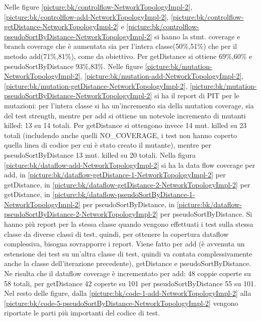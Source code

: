 \documentclass[10pt, a4paper]{article}
\newcommand{\getpicturelabel}[1]{picture:#1}
\begin{document}
	Nelle figure \ref{\getpicturelabel{bk/controlflow-NetworkTopologyImpl-2}}, \ref{\getpicturelabel{bk/controlflow-add-NetworkTopologyImpl-2}}, \ref{\getpicturelabel{bk/controlflow-getDistance-NetworkTopologyImpl-2}} e \ref{\getpicturelabel{bk/controlflow-pseudoSortByDistance-NetworkTopologyImpl-2}} si hanno la stmt. coverage e branch coverage che è aumentata sia per l'intera classe(50\%,51\%) che per il metodo add(71\%,81\%), come da obiettivo.
	Per getDistance si ottiene 69\%,60\% e pseudoSortByDistance 93\%,83\%.
	Nelle figure \ref{\getpicturelabel{bk/mutation-NetworkTopologyImpl-2}}, 
	\ref{\getpicturelabel{bk/mutation-add-NetworkTopologyImpl-2}},
	\ref{\getpicturelabel{bk/mutation-getDistance-NetworkTopologyImpl-2}},
	\ref{\getpicturelabel{bk/mutation-pseudoSortByDistance-NetworkTopologyImpl-2}} si ha il report di PIT per
	le mutazioni: per l'intera classe si ha un'incremento sia della mutation coverage, sia del test strength,
	mentre per add si ottiene un notevole incremento di mutanti killed: 13 su 14 totali.
	Per getDistance si ottengono invece 14 mut. killed su 23 totali (includendo anche quelli
	NO\_COVERAGE, i test non hanno coperto quella linea di codice per cui è stato creato il mutante), mentre per
	pseudoSortByDistance 13 mut. killed su 20 totali.
	Nella figura \ref{\getpicturelabel{bk/dataflow-add-NetworkTopologyImpl-2}} si ha la data flow coverage per add,
	in \ref{\getpicturelabel{bk/dataflow-getDistance-1-NetworkTopologyImpl-2}} per getDistance,
	in \ref{\getpicturelabel{bk/dataflow-getDistance-2-NetworkTopologyImpl-2}} per getDistance,
	in \ref{\getpicturelabel{bk/dataflow-pseudoSortByDistance-1-NetworkTopologyImpl-2}} per pseudoSortByDistance,
	in \ref{\getpicturelabel{bk/dataflow-pseudoSortByDistance-2-NetworkTopologyImpl-2}} per pseudoSortByDistance.
	Si hanno più report per la stessa classe quando vengono effettuati i test sulla stessa classe da diverse classi
	di test, quindi, per ottenere la copertura dataflow complessiva, bisogna sovrapporre i report. Viene fatto 
	per add (è avvenuta un estensione dei test su un'altra classe di test, quindi va contata complessivamente anche
	la classe dell'iterazione precedente), getDistance e pseudoSortByDistance.
	Ne risulta che il dataflow coverage è incrementato per add: 48 coppie coperte su 58 totali, per
	getDistance 42 coperte su 101 per pseudoSortByDistance 55 su 101. Nel resto delle figure, dalla
	\ref{\getpicturelabel{bk/code-1-add-NetworkTopologyImpl-2}} alla 
	\ref{\getpicturelabel{bk/code-5-pseudoSortByDistance-NetworkTopologyImpl-2}} 
	vengono riportate le parti più importanti del codice di test.
	
\end{document}
